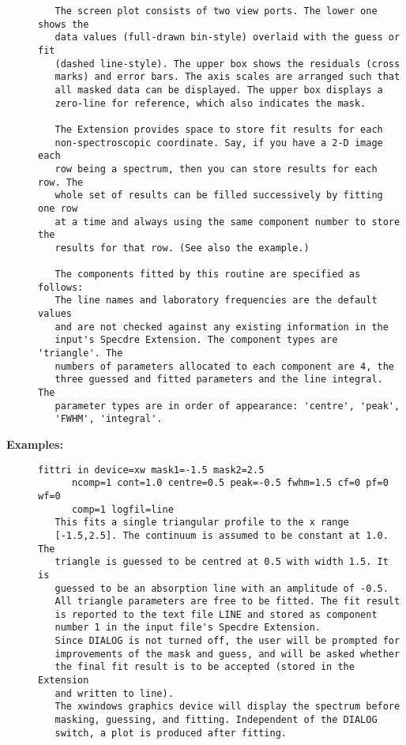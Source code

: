 \begin{description}
\begin{verbatim}
   The screen plot consists of two view ports. The lower one shows the
   data values (full-drawn bin-style) overlaid with the guess or fit
   (dashed line-style). The upper box shows the residuals (cross
   marks) and error bars. The axis scales are arranged such that
   all masked data can be displayed. The upper box displays a
   zero-line for reference, which also indicates the mask.

   The Extension provides space to store fit results for each
   non-spectroscopic coordinate. Say, if you have a 2-D image each
   row being a spectrum, then you can store results for each row. The
   whole set of results can be filled successively by fitting one row
   at a time and always using the same component number to store the
   results for that row. (See also the example.)

   The components fitted by this routine are specified as follows:
   The line names and laboratory frequencies are the default values
   and are not checked against any existing information in the
   input's Specdre Extension. The component types are 'triangle'. The
   numbers of parameters allocated to each component are 4, the
   three guessed and fitted parameters and the line integral. The
   parameter types are in order of appearance: 'centre', 'peak',
   'FWHM', 'integral'.
\end{verbatim}

\item [{\bf Examples:}]
\begin{verbatim}
fittri in device=xw mask1=-1.5 mask2=2.5
      ncomp=1 cont=1.0 centre=0.5 peak=-0.5 fwhm=1.5 cf=0 pf=0 wf=0
      comp=1 logfil=line
   This fits a single triangular profile to the x range
   [-1.5,2.5]. The continuum is assumed to be constant at 1.0. The
   triangle is guessed to be centred at 0.5 with width 1.5. It is
   guessed to be an absorption line with an amplitude of -0.5.
   All triangle parameters are free to be fitted. The fit result
   is reported to the text file LINE and stored as component
   number 1 in the input file's Specdre Extension.
   Since DIALOG is not turned off, the user will be prompted for
   improvements of the mask and guess, and will be asked whether
   the final fit result is to be accepted (stored in the Extension
   and written to line).
   The xwindows graphics device will display the spectrum before
   masking, guessing, and fitting. Independent of the DIALOG
   switch, a plot is produced after fitting.


\end{verbatim}
\end{description}
